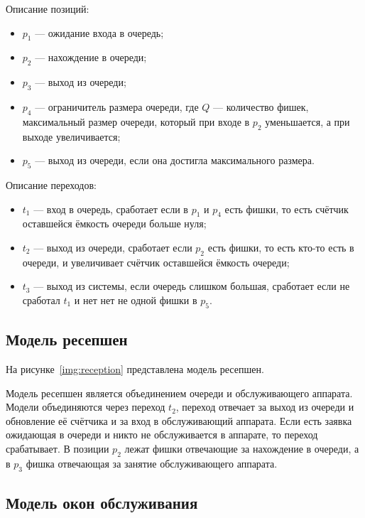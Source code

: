 Описание позиций:
\begin{itemize}[label=---]
	\item $p_1$ --- ожидание входа в очередь;
	\item $p_2$ --- нахождение в очереди;
	\item $p_3$ --- выход из очереди;
	\item $p_4$ --- ограничитель размера очереди, где $Q$ --- количество фишек, максимальный размер очереди, который при входе в $p_2$ уменьшается, а при выходе увеличивается;
	\item $p_5$ --- выход из очереди, если она достигла максимального размера.
\end{itemize}

Описание переходов:
\begin{itemize}[label=---]
	\item $t_1$ --- вход в очередь, сработает если в $p_1$ и $p_4$ есть фишки, то есть счётчик оставшейся ёмкость очереди больше нуля;
	\item $t_2$ --- выход из очереди, сработает если $p_2$ есть фишки, то есть кто-то есть в очереди, и увеличивает счётчик оставшейся ёмкость очереди;
	\item $t_3$ --- выход из системы, если очередь слишком большая, сработает если не сработал $t_1$ и нет нет не одной фишки в $p_5$.
\end{itemize}

\subsection{Модель ресепшен}

На рисунке~\ref{img:reception} представлена модель ресепшен.

\FloatBarrier

Модель ресепшен является объединением очереди и обслуживающего аппарата. Модели объединяются через переход $t_2$, переход отвечает за выход из очереди и обновление её счётчика и за вход в обслуживающий аппарата. Если есть заявка ожидающая в очереди и никто не обслуживается в аппарате, то переход срабатывает. В позиции $p_2$ лежат фишки отвечающие за нахождение в очереди, а в $p_3$ фишка отвечающая за занятие обслуживающего аппарата.

\subsection{Модель окон обслуживания}

